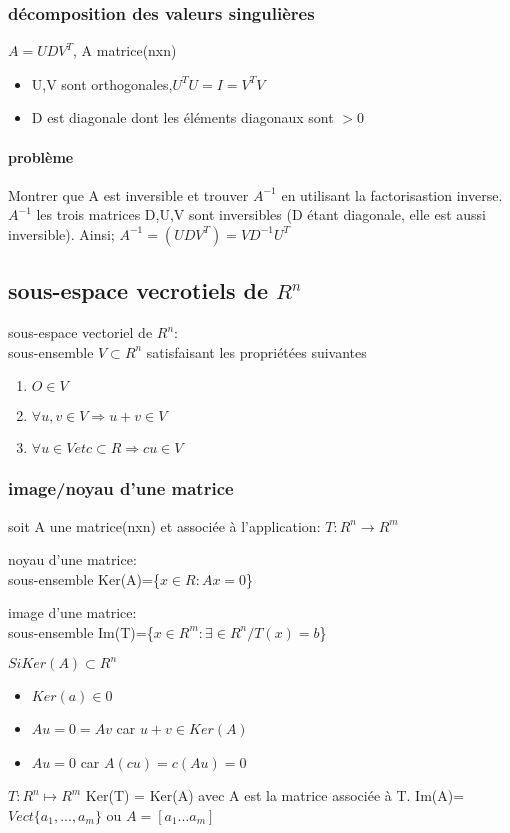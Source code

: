 \documentclass[a4paper,10pt]{article}
\begin{document}
\subsubsection{décomposition des valeurs singulières}
$A=UDV^{T}$, A matrice(nxn)
\begin{itemize}
 \item U,V sont orthogonales,$U^TU=I=V^TV$
 \item D est diagonale dont les éléments diagonaux sont $>0$
\end{itemize}
\paragraph{problème}
Montrer que A est inversible et trouver $A^{-1}$ en utilisant la factorisastion inverse.
$A^{-1}$ les trois matrices D,U,V sont inversibles (D étant diagonale, elle est aussi inversible).
\newline
Ainsi;
$A^{-1}=(UDV^T)=VD^{-1}U^T$
\subsection{sous-espace vecrotiels de $R^n$ }
\begin{description}
 \item sous-espace vectoriel de $R^n$:\\{sous-ensemble $V\subset R^n$ satisfaisant les propriétées suivantes} 
\end{description}
\begin{enumerate}
 \item $O\in V$
 \item $\forall u,v\in V\Rightarrow u+v\in V$
 \item $\forall u\in V et c\subset R\Rightarrow cu\in V$
\end{enumerate}
\subsubsection{image/noyau d'une matrice}
soit A une matrice(nxn) et associée à l'application:
\newline
$T:R^n\rightarrow R^m$
\begin{description}
 \item noyau d'une matrice:\\{sous-ensemble Ker(A)=\{$x\in R:Ax=0$\}}
 \item image d'une matrice:\\{sous-ensemble Im(T)=\{$x\in R^m:\exists \in R^n/T(x)=b$\}}
\end{description}
$Si Ker(A)\subset R^n$
\begin{itemize}
 \item $Ker(a)\in 0$
 \item $Au=0=Av$ car $u+v\in Ker(A)$
 \item $Au=0$ car $A(cu)= c(Au)=0$
\end{itemize}
$T:R^n\mapsto R^m$
\newline
Ker(T) = Ker(A) avec A est la matrice associée à T. 
\newline
Im(A)=$Vect\{a_1,...,a_m\}$ ou $A=[a_1...a_m]$
\end{document}
